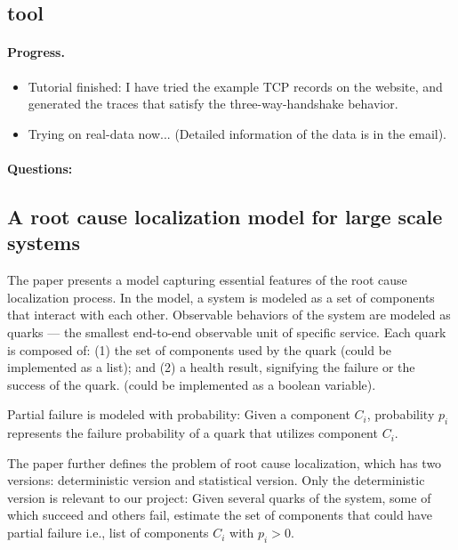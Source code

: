\documentclass{article}
\begin{document}
\subsection{\saf tool}
\label{sec:saftool}

\paragraph{Progress.}

\begin{itemize}
\item Tutorial finished: I have tried the example TCP records on the \saf
  website, and generated the traces that satisfy the three-way-handshake
  behavior.
\item Trying \saf on real-data now... (Detailed information of the data is in
  the email).
\end{itemize}

\paragraph{Questions:}


\subsection{A root cause localization model for large scale systems}
\label{sec:rootcause}

The paper presents a model capturing essential features of the root cause
localization process. In the model, a system is modeled as a set of components
that interact with each other. Observable behaviors of the system are modeled as
quarks --- the smallest end-to-end observable unit of specific service. Each
quark is composed of:
(1) the set of components used by the quark (could be implemented as a list); and
(2) a health result, signifying the failure or the success of the quark. (could
be implemented as a boolean variable).

Partial failure is modeled with probability: Given a component $C_i$,
probability $p_i$ represents the failure probability of a quark that utilizes
component $C_i$.

The paper further defines the problem of root cause localization, which has two
versions: deterministic version and statistical version. Only the deterministic
version is relevant to our project: Given several quarks of the system, some of
which succeed and others fail, estimate the set of components that could have partial
failure i.e., list of components $C_i$ with $p_i > 0$.
\end{document}
